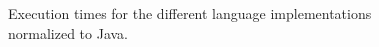 \documentclass[12pt]{article}
\begin{document}
\begin{figure}[ht]
\begin{center}
\LanguagesPerfComparisonPlot
\end{center}
\vspace*{-5pt}
\caption{Execution times for the different language implementations normalized to Java.}
\label{fig:perf-overview}
\end{figure}

\LanguagesTableSummary

\LanguagesTableOverall
\end{document}
